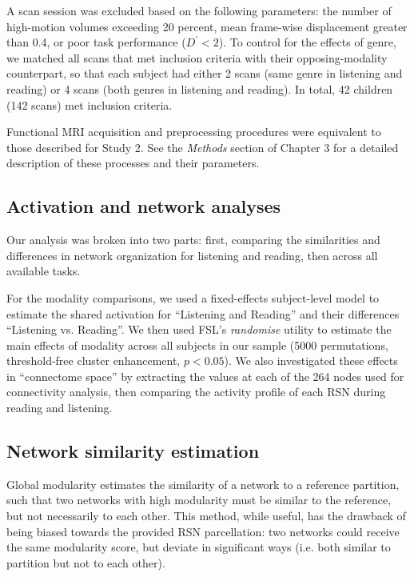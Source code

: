A scan session was excluded based on the following parameters: the number of high-motion volumes exceeding 20 percent, mean frame-wise displacement greater than 0.4, or poor task performance ($D^\prime < 2$). To control for the effects of genre, we matched all scans that met inclusion criteria with their opposing-modality counterpart, so that each subject had either 2 scans (same genre in listening and reading) or 4 scans (both genres in listening and reading). In total, 42 children (142 scans) met inclusion criteria.

Functional MRI acquisition and preprocessing procedures were equivalent to those described for Study 2. See the \textit{Methods} section of Chapter 3 for a detailed description of these processes and their parameters.

\subsection{Activation and network analyses}

Our analysis was broken into two parts: first, comparing the similarities and differences in network organization for listening and reading, then across all available tasks. 

For the modality comparisons, we used a fixed-effects subject-level model to estimate the shared activation for ``Listening and Reading'' and their differences ``Listening vs. Reading''. We then used FSL's \textit{randomise} utility to estimate the main effects of modality across all subjects in our sample (5000 permutations, threshold-free cluster enhancement, $p < 0.05$).  We also investigated these effects in ``connectome space'' by extracting the values at each of the 264 nodes used for connectivity analysis, then comparing the activity profile of each RSN during reading and listening.

\subsection{Network similarity estimation}

Global modularity estimates the similarity of a network to a reference partition, such that two networks with high modularity must be similar to the reference, but not necessarily to each other. This method, while useful, has the drawback of being biased towards the provided RSN parcellation: two networks could receive the same modularity score, but deviate in significant ways (i.e. both similar to partition but not to each other). 

